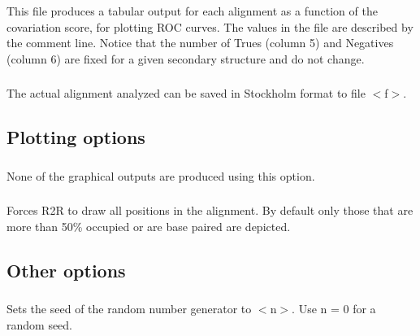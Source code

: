 This file produces a tabular output for each alignment as a function
of the covariation score, for plotting ROC curves. The values in the
file are described by the comment line. Notice that the number of
Trues (column 5) and Negatives (column 6) are fixed for a given
secondary structure and do not change.

\subsubsection{} The actual alignment analyzed can be saved in Stockholm format to file $<$f$>$.


\subsection{Plotting options}

\subsubsection{} None of the graphical outputs are produced using this option.


\subsubsection{} Forces R2R to draw all positions in the alignment. By default only
those that are more than 50\% occupied or are base paired are
depicted.


\subsection{Other options}

\subsubsection{} Sets the seed of the random number generator to $<$n$>$. Use n = 0 for a random seed.










